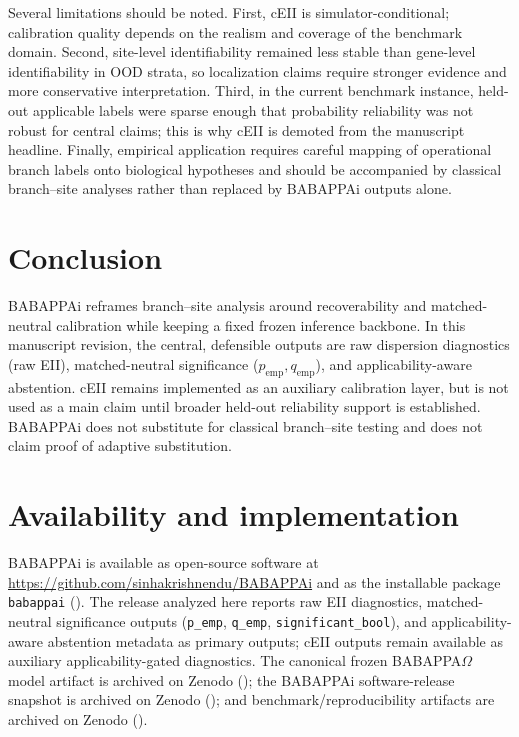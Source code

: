 \documentclass[11pt]{article}
\begin{document}
Several limitations should be noted. First, cEII is simulator-conditional; calibration quality depends on the realism and coverage of the benchmark domain. Second, site-level identifiability remained less stable than gene-level identifiability in OOD strata, so localization claims require stronger evidence and more conservative interpretation. Third, in the current benchmark instance, held-out applicable labels were sparse enough that probability reliability was not robust for central claims; this is why cEII is demoted from the manuscript headline. Finally, empirical application requires careful mapping of operational branch labels onto biological hypotheses and should be accompanied by classical branch--site analyses rather than replaced by BABAPPAi outputs alone.

\section{Conclusion}

BABAPPAi reframes branch--site analysis around recoverability and matched-neutral calibration while keeping a fixed frozen inference backbone. In this manuscript revision, the central, defensible outputs are raw dispersion diagnostics (raw EII), matched-neutral significance ($p_{\mathrm{emp}}, q_{\mathrm{emp}}$), and applicability-aware abstention. cEII remains implemented as an auxiliary calibration layer, but is not used as a main claim until broader held-out reliability support is established. BABAPPAi does not substitute for classical branch--site testing and does not claim proof of adaptive substitution.

\section*{Availability and implementation}

BABAPPAi is available as open-source software at \url{https://github.com/sinhakrishnendu/BABAPPAi} and as the installable package \texttt{babappai} (\cite{BABAPPAiRepo}). The release analyzed here reports raw EII diagnostics, matched-neutral significance outputs (\texttt{p\_emp}, \texttt{q\_emp}, \texttt{significant\_bool}), and applicability-aware abstention metadata as primary outputs; cEII outputs remain available as auxiliary applicability-gated diagnostics. The canonical frozen BABAPPA$\Omega$ model artifact is archived on Zenodo (\cite{BABAPPAOmegaModel}); the BABAPPAi software-release snapshot is archived on Zenodo (\cite{BABAPPAiZenodo}); and benchmark/reproducibility artifacts are archived on Zenodo (\cite{BABAPPAiBenchmarkArchive}).
\end{document}
